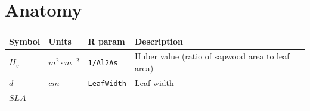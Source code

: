 \documentclass[]{book}
\begin{document}
\section{Anatomy}\label{anatomy}

\begin{longtable}[]{@{}llll@{}}
\toprule
\begin{minipage}[b]{0.11\columnwidth}\raggedright\strut
Symbol\strut
\end{minipage} & \begin{minipage}[b]{0.10\columnwidth}\raggedright\strut
Units\strut
\end{minipage} & \begin{minipage}[b]{0.12\columnwidth}\raggedright\strut
R param\strut
\end{minipage} & \begin{minipage}[b]{0.45\columnwidth}\raggedright\strut
Description\strut
\end{minipage}\tabularnewline
\midrule
\endhead
\begin{minipage}[t]{0.11\columnwidth}\raggedright\strut
\(H_v\)\strut
\end{minipage} & \begin{minipage}[t]{0.10\columnwidth}\raggedright\strut
\(m^2 \cdot m^{-2}\)\strut
\end{minipage} & \begin{minipage}[t]{0.12\columnwidth}\raggedright\strut
\texttt{1/Al2As}\strut
\end{minipage} & \begin{minipage}[t]{0.45\columnwidth}\raggedright\strut
Huber value (ratio of sapwood area to leaf area)\strut
\end{minipage}\tabularnewline
\begin{minipage}[t]{0.11\columnwidth}\raggedright\strut
\(d\)\strut
\end{minipage} & \begin{minipage}[t]{0.10\columnwidth}\raggedright\strut
\(cm\)\strut
\end{minipage} & \begin{minipage}[t]{0.12\columnwidth}\raggedright\strut
\texttt{LeafWidth}\strut
\end{minipage} & \begin{minipage}[t]{0.45\columnwidth}\raggedright\strut
Leaf width\strut
\end{minipage}\tabularnewline
\begin{minipage}[t]{0.11\columnwidth}\raggedright\strut
\(SLA\)\strut
\end{minipage} & \begin{minipage}[t]{0.10\columnwidth}\raggedright\strut

\end{minipage}
\end{longtable}
\end{document}

